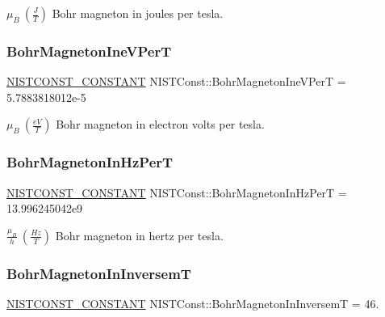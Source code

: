 $\mu_B \ (\frac{J}{T})$ Bohr magneton in joules per tesla. \mbox{\label{group___n_i_s_t_const-_bohr_magneton_ga5a7384205d0127ffe031897a6b0c3dca}} 
\subsubsection{\texorpdfstring{Bohr\+Magneton\+Ine\+V\+PerT}{BohrMagnetonIneVPerT}}
{\footnotesize\ttfamily \mbox{\hyperlink{group___n_i_s_t_const-_macros_ga2b0fc1d7452373f816175dd86ce26729}{N\+I\+S\+T\+C\+O\+N\+S\+T\+\_\+\+C\+O\+N\+S\+T\+A\+NT}} N\+I\+S\+T\+Const\+::\+Bohr\+Magneton\+Ine\+V\+PerT = 5.\+7883818012e-\/5}

$\mu_B \ (\frac{eV}{T})$ Bohr magneton in electron volts per tesla. \mbox{\label{group___n_i_s_t_const-_bohr_magneton_gaa57dcf7dffc991b2b8ab1009687691e8}} 
\subsubsection{\texorpdfstring{Bohr\+Magneton\+In\+Hz\+PerT}{BohrMagnetonInHzPerT}}
{\footnotesize\ttfamily \mbox{\hyperlink{group___n_i_s_t_const-_macros_ga2b0fc1d7452373f816175dd86ce26729}{N\+I\+S\+T\+C\+O\+N\+S\+T\+\_\+\+C\+O\+N\+S\+T\+A\+NT}} N\+I\+S\+T\+Const\+::\+Bohr\+Magneton\+In\+Hz\+PerT = 13.\+996245042e9}

$\frac{\mu_B}{h} \ (\frac{Hz}{T})$ Bohr magneton in hertz per tesla. \mbox{\label{group___n_i_s_t_const-_bohr_magneton_ga4ad979b4ddb4aeebcbff236726fa64ec}} 
\subsubsection{\texorpdfstring{Bohr\+Magneton\+In\+InversemT}{BohrMagnetonInInversemT}}
{\footnotesize\ttfamily \mbox{\hyperlink{group___n_i_s_t_const-_macros_ga2b0fc1d7452373f816175dd86ce26729}{N\+I\+S\+T\+C\+O\+N\+S\+T\+\_\+\+C\+O\+N\+S\+T\+A\+NT}} N\+I\+S\+T\+Const\+::\+Bohr\+Magneton\+In\+InversemT = 46.}

